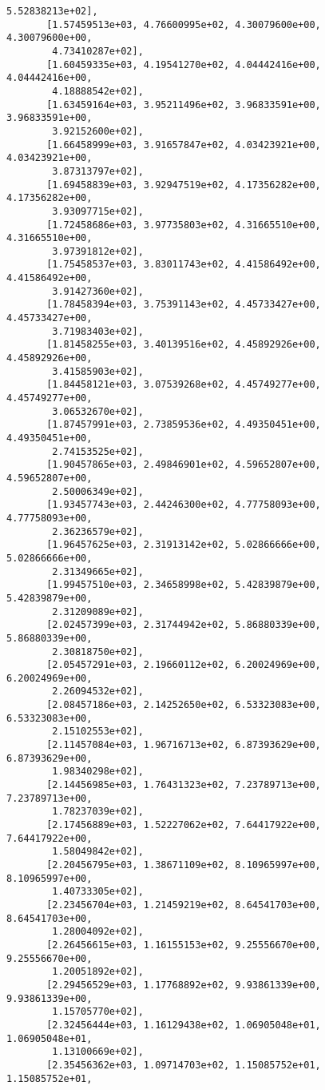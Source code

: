 \documentclass[11pt]{article}
\begin{document}
\begin{tcolorbox}[breakable, size=fbox, boxrule=.5pt, pad at break*=1mm, opacityfill=0]
\begin{Verbatim}[commandchars=\\\{\}]
        5.52838213e+02],
       [1.57459513e+03, 4.76600995e+02, 4.30079600e+00, 4.30079600e+00,
        4.73410287e+02],
       [1.60459335e+03, 4.19541270e+02, 4.04442416e+00, 4.04442416e+00,
        4.18888542e+02],
       [1.63459164e+03, 3.95211496e+02, 3.96833591e+00, 3.96833591e+00,
        3.92152600e+02],
       [1.66458999e+03, 3.91657847e+02, 4.03423921e+00, 4.03423921e+00,
        3.87313797e+02],
       [1.69458839e+03, 3.92947519e+02, 4.17356282e+00, 4.17356282e+00,
        3.93097715e+02],
       [1.72458686e+03, 3.97735803e+02, 4.31665510e+00, 4.31665510e+00,
        3.97391812e+02],
       [1.75458537e+03, 3.83011743e+02, 4.41586492e+00, 4.41586492e+00,
        3.91427360e+02],
       [1.78458394e+03, 3.75391143e+02, 4.45733427e+00, 4.45733427e+00,
        3.71983403e+02],
       [1.81458255e+03, 3.40139516e+02, 4.45892926e+00, 4.45892926e+00,
        3.41585903e+02],
       [1.84458121e+03, 3.07539268e+02, 4.45749277e+00, 4.45749277e+00,
        3.06532670e+02],
       [1.87457991e+03, 2.73859536e+02, 4.49350451e+00, 4.49350451e+00,
        2.74153525e+02],
       [1.90457865e+03, 2.49846901e+02, 4.59652807e+00, 4.59652807e+00,
        2.50006349e+02],
       [1.93457743e+03, 2.44246300e+02, 4.77758093e+00, 4.77758093e+00,
        2.36236579e+02],
       [1.96457625e+03, 2.31913142e+02, 5.02866666e+00, 5.02866666e+00,
        2.31349665e+02],
       [1.99457510e+03, 2.34658998e+02, 5.42839879e+00, 5.42839879e+00,
        2.31209089e+02],
       [2.02457399e+03, 2.31744942e+02, 5.86880339e+00, 5.86880339e+00,
        2.30818750e+02],
       [2.05457291e+03, 2.19660112e+02, 6.20024969e+00, 6.20024969e+00,
        2.26094532e+02],
       [2.08457186e+03, 2.14252650e+02, 6.53323083e+00, 6.53323083e+00,
        2.15102553e+02],
       [2.11457084e+03, 1.96716713e+02, 6.87393629e+00, 6.87393629e+00,
        1.98340298e+02],
       [2.14456985e+03, 1.76431323e+02, 7.23789713e+00, 7.23789713e+00,
        1.78237039e+02],
       [2.17456889e+03, 1.52227062e+02, 7.64417922e+00, 7.64417922e+00,
        1.58049842e+02],
       [2.20456795e+03, 1.38671109e+02, 8.10965997e+00, 8.10965997e+00,
        1.40733305e+02],
       [2.23456704e+03, 1.21459219e+02, 8.64541703e+00, 8.64541703e+00,
        1.28004092e+02],
       [2.26456615e+03, 1.16155153e+02, 9.25556670e+00, 9.25556670e+00,
        1.20051892e+02],
       [2.29456529e+03, 1.17768892e+02, 9.93861339e+00, 9.93861339e+00,
        1.15705770e+02],
       [2.32456444e+03, 1.16129438e+02, 1.06905048e+01, 1.06905048e+01,
        1.13100669e+02],
       [2.35456362e+03, 1.09714703e+02, 1.15085752e+01, 1.15085752e+01,

\end{Verbatim}
\end{tcolorbox}
\end{document}
